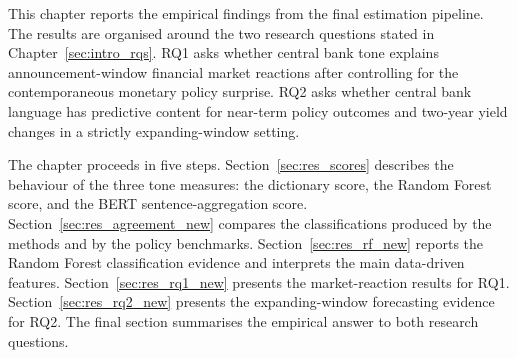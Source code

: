 %
%
%

\providecommand{\sym}[1]{\ensuremath{^{\text{#1}}}}


This chapter reports the empirical findings from the final estimation pipeline.
The results are organised around the two research questions stated in
Chapter~\ref{sec:intro_rqs}. RQ1 asks whether central bank tone explains
announcement-window financial market reactions after controlling for the
contemporaneous monetary policy surprise. RQ2 asks whether central bank
language has predictive content for near-term policy outcomes and two-year
yield changes in a strictly expanding-window setting.

The chapter proceeds in five steps. Section~\ref{sec:res_scores} describes the
behaviour of the three tone measures: the dictionary score, the Random Forest
score, and the BERT sentence-aggregation score.
Section~\ref{sec:res_agreement_new} compares the classifications produced by
the methods and by the policy benchmarks. Section~\ref{sec:res_rf_new} reports
the Random Forest classification evidence and interprets the main data-driven
features. Section~\ref{sec:res_rq1_new} presents the market-reaction results
for RQ1. Section~\ref{sec:res_rq2_new} presents the expanding-window
forecasting evidence for RQ2. The final section summarises the empirical
answer to both research questions.

